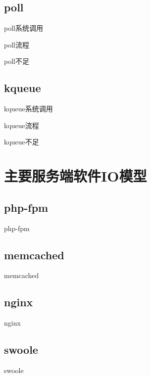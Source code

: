 \documentclass[UTF8]{beamer}
\begin{document}
\subsection{poll}
\begin{frame}[fragile]{poll系统调用}
  \begin{ccode}
  \end{ccode}
\end{frame}
\begin{frame}[fragile]{poll流程}
  \begin{ccode}
  \end{ccode}
\end{frame}
\begin{frame}[fragile]{poll不足}
  \begin{ccode}
  \end{ccode}
\end{frame}
\subsection{kqueue}
\begin{frame}[fragile]{kqueue系统调用}
  \begin{ccode}
  \end{ccode}
\end{frame}
\begin{frame}[fragile]{kqueue流程}
  \begin{ccode}
  \end{ccode}
\end{frame}
\begin{frame}[fragile]{kqueue不足}
  \begin{ccode}
  \end{ccode}
\end{frame}
\section{主要服务端软件IO模型}
\subsection{php-fpm}
\begin{frame}[fragile]{php-fpm}
  \begin{ccode}
  \end{ccode}
\end{frame}
\subsection{memcached}
\begin{frame}[fragile]{memcached}
  \begin{ccode}
  \end{ccode}
\end{frame}
\subsection{nginx}
\begin{frame}[fragile]{nginx}
  \begin{ccode}
  \end{ccode}
\end{frame}
\subsection{swoole}
\begin{frame}[fragile]{swoole}
  \begin{ccode}
  \end{ccode}
\end{frame}
\end{document}
